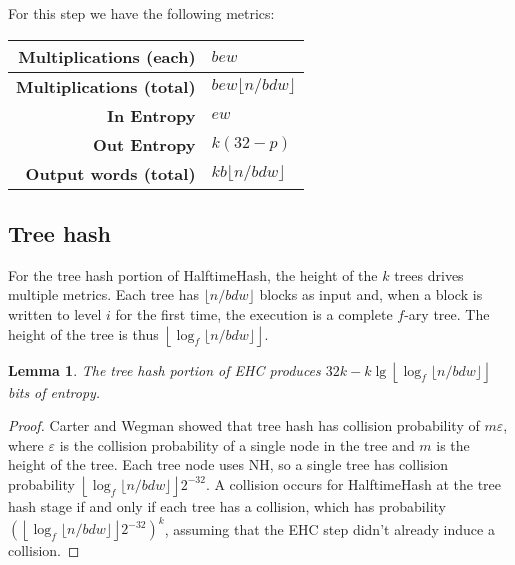 \documentclass[sigconf, nonacm]{acmart}
\newtheorem*{lemma}{Lemma}
\begin{document}

For this step we have the following metrics:

\begin{tabular}{|r|l|}
    \hline {\bf Multiplications (each)} & $b e w$ \\
    \hline {\bf Multiplications (total)} & $b e w \lfloor n / b d w\rfloor$ \\
    \hline {\bf In Entropy} & $e w$ \\
    \hline {\bf Out Entropy} & $k (32-p)$\\
    \hline {\bf Output words (total)} & $k b \lfloor n / b d w\rfloor $\\
    \hline
\end{tabular}


\subsection{Tree hash}

For the tree hash portion of HalftimeHash, the height of the $k$ trees drives multiple metrics.
Each tree has $\lfloor n / b d w \rfloor$ blocks as input and, when a block is written to level $i$ for the first time, the execution is a complete $f$-ary tree.
The height of the tree is thus $\left\lfloor \log_f \lfloor n / b d w \rfloor \right\rfloor$.

\begin{lemma}
The tree hash portion of EHC produces $32k - k\lg\left\lfloor\log_f \lfloor n/b d w\rfloor\right\rfloor$ bits of entropy.
\end{lemma}
\begin{proof}
  Carter and Wegman showed that tree hash has collision probability of $m \varepsilon$, where $\varepsilon$ is the collision probability of a single node in the tree and $m$ is the height of the tree.
  Each tree node uses NH, so a single tree has collision probability $\left\lfloor \log_f \lfloor n / b d w \rfloor \right\rfloor 2^{-32}$.
  A collision occurs for HalftimeHash at the tree hash stage if and only if each tree has a collision, which has probability $\left(\left\lfloor \log_f \lfloor n / b d w \rfloor \right\rfloor 2^{-32}\right)^k$, assuming that the EHC step didn't already induce a collision.
\end{proof}
\end{document}

